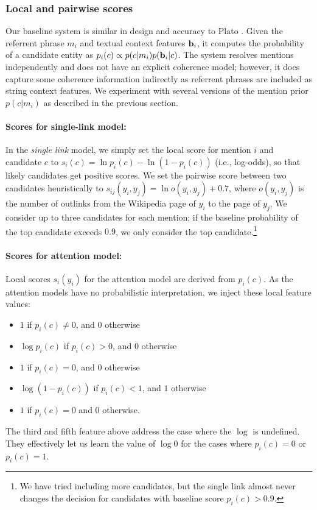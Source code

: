 \subsubsection{Local and pairwise scores}
\label{sec:expt:features}

Our baseline system is similar in design and accuracy to Plato \cite{Lazic2015}.
Given the referrent phrase $m_i$ and textual context features ${\bf b}_i$, it computes
the probability of a candidate entity as $p_i(c) \propto p(c|m_i)p({\bf b}_i|c)$. 
The system resolves mentions independently and does not have an explicit coherence model;
however, it does capture some coherence information indirectly as referrent phrases are
included as string context features. We experiment with several versions of the
mention prior $p(c|m_i)$ as described in the previous section. 


\paragraph*{Scores for single-link model:}
In the \emph{single link} model, we simply set the local score for
mention $i$ and candidate $c$ to $s_i(c) = \ln p_i(c) - \ln (1 -
p_i(c))$ (i.e., log-odds), so that likely candidates get positive
scores.  We set the pairwise score between two candidates heuristically to
$s_{ij}(y_i, y_j) = \ln o(y_i, y_j) + 0.7$, where $o(y_i, y_j)$ is the number of
outlinks from the Wikipedia page of $y_i$ to the page of $y_j$.  We
consider up to three candidates for each mention; if the baseline
probability of the top candidate exceeds $0.9$, we only consider the top
candidate.\footnote{We have tried including more candidates, but the single link
almost never changes the decision for candidates with baseline score $p_i(c)>0.9$.}

\paragraph*{Scores for attention model:}
Local scores $s_i(y_i)$ for the attention model are derived from
$p_i(c)$.  As the attention models have no probabilistic
interpretation, we inject these local feature values:
\begin{itemize}
\item $1$ if $p_i(c)\ne 0$, and 0 otherwise
\item $\log p_i(c)$ if $p_i(c)>0$, and $0$ otherwise
\item $1$ if $p_i(c)=0$, and $0$ otherwise
\item $\log(1-p_i(c))$ if $p_i(c)<1$, and $1$ otherwise
\item $1$ if $p_i(c)=0$ and $0$ otherwise.
\end{itemize}
%
The third and fifth feature above address the case where the $\log$ is undefined. They effectively let us learn the value of $\log{0}$ for the
cases where $p_i(c)=0$ or $p_i(c)=1$.

